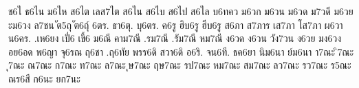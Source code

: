 {%
ช6ไ
ธ6ไน
ม6ไห
ส6ไต
เลส7ไต
ส6ไน
ส6ไบ
ส6ไป
ส6ไล
บ6ทคว
ม6วก
ม6วน
ม6วด
ม7วดี
ม6วย
ะม6วง
ล7ชน
ัต5ถุ
ัต6ถุ์
6ตร.
ธา6ตุ.
บุ6ตร.
ค6รู
ฮิบ6รู
ฮีบ6รู
ส6ภา
ส7ภาร
เส7ภา
โส7ภา
ผ6วา
น6คร.
.เห6ยง
เปี่6
เขี้6
ม6ณี
คาม7ณี
.รม7ณี
.รัม7ณี
หม7ณี
ง6วด
ง6วน
วัง7วน
ง6วย
มง6วง
อย6อด
พ6ญา
จุ6รณ
ฤ6ชา
.ฤ6ทัย
พรร6ดิ
สวา6ดิ
อ6ริ.
จน6ที.
ธค6ยา
นิม6นา
ย์ม6นา
า7ณะ
ิ7ณะ
ุ7ณะ
ณ7ณะ
ก7ณะ
ท7ณะ
ล7ณะ
ุษ7ณะ
ฤษ7ณะ
รป7ณะ
หม7ณะ
สม7ณะ
ลว7ณะ
รว7ณะ
ร5ณะ
ณร6สี
ก6นะ
ยก7นะ
}
